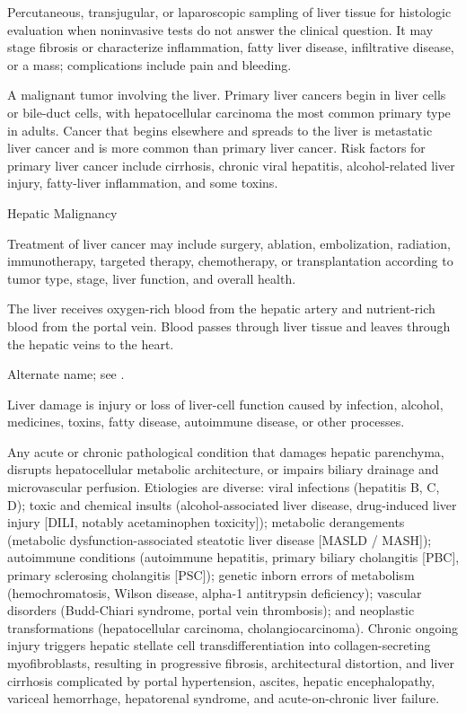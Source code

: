  Percutaneous, transjugular, or laparoscopic sampling of liver tissue for histologic evaluation when noninvasive tests do not answer the clinical question. It may stage fibrosis or characterize inflammation, fatty liver disease, infiltrative disease, or a mass; complications include pain and bleeding.

 A malignant tumor involving the liver. Primary liver cancers begin in liver cells or bile-duct cells, with hepatocellular carcinoma the most common primary type in adults. Cancer that begins elsewhere and spreads to the liver is metastatic liver cancer and is more common than primary liver cancer. Risk factors for primary liver cancer include cirrhosis, chronic viral hepatitis, alcohol-related liver injury, fatty-liver inflammation, and some toxins.

\synonyms
Hepatic Malignancy

 Treatment of liver cancer may include surgery, ablation, embolization, radiation, immunotherapy, targeted therapy, chemotherapy, or transplantation according to tumor type, stage, liver function, and overall health.

 The liver receives oxygen-rich blood from the hepatic artery and nutrient-rich blood from the portal vein. Blood passes through liver tissue and leaves through the hepatic veins to the heart.

 Alternate name; see .

 Liver damage is injury or loss of liver-cell function caused by infection, alcohol, medicines, toxins, fatty disease, autoimmune disease, or other processes.

 Any acute or chronic pathological condition that damages hepatic parenchyma, disrupts hepatocellular metabolic architecture, or impairs biliary drainage and microvascular perfusion. Etiologies are diverse: viral infections (hepatitis B, C, D); toxic and chemical insults (alcohol-associated liver disease, drug-induced liver injury [DILI, notably acetaminophen toxicity]); metabolic derangements (metabolic dysfunction-associated steatotic liver disease [MASLD / MASH]); autoimmune conditions (autoimmune hepatitis, primary biliary cholangitis [PBC], primary sclerosing cholangitis [PSC]); genetic inborn errors of metabolism (hemochromatosis, Wilson disease, alpha-1 antitrypsin deficiency); vascular disorders (Budd-Chiari syndrome, portal vein thrombosis); and neoplastic transformations (hepatocellular carcinoma, cholangiocarcinoma). Chronic ongoing injury triggers hepatic stellate cell transdifferentiation into collagen-secreting myofibroblasts, resulting in progressive fibrosis, architectural distortion, and liver cirrhosis complicated by portal hypertension, ascites, hepatic encephalopathy, variceal hemorrhage, hepatorenal syndrome, and acute-on-chronic liver failure.

